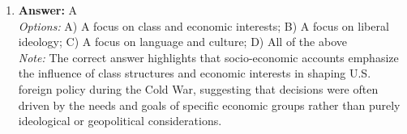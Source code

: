 \documentclass[12pt]{article}
\begin{document}
\begin{enumerate}[label=\arabic*.]
\\ \textit{Note:} The term 'American multiplication table' refers to the exponential growth of the US population during the 19 th century, highlighting how rapid demographic increases were viewed as a fundamental aspect of American development and prosperity.
\item \textbf{Answer:} A
\\ \textit{Options:} A) A focus on class and economic interests; B) A focus on liberal ideology; C) A focus on language and culture; D) All of the above
\\ \textit{Note:} The correct answer highlights that socio-economic accounts emphasize the influence of class structures and economic interests in shaping U.S. foreign policy during the Cold War, suggesting that decisions were often driven by the needs and goals of specific economic groups rather than purely ideological or geopolitical considerations.
\end{enumerate}
\end{document}
